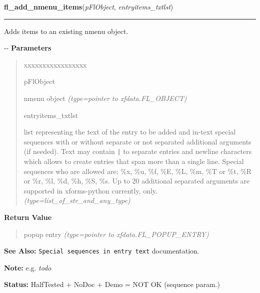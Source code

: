 \hspace{.8\funcindent}\begin{boxedminipage}{\funcwidth}

    \raggedright \textbf{fl\_add\_nmenu\_items}(\textit{pFlObject}, \textit{entryitems\_txtlst})

    \vspace{-1.5ex}

    \rule{\textwidth}{0.5\fboxrule}
\setlength{\parskip}{2ex}

Adds items to an existing nmenu object.

-{}-
\setlength{\parskip}{1ex}
      \textbf{Parameters}
      \vspace{-1ex}

      \begin{quote}
        \begin{Ventry}{xxxxxxxxxxxxxxxxx}

          \item[pFlObject]


nmenu object
            {\it (type=pointer to xfdata.FL\_OBJECT)}

          \item[entryitems\_txtlst]


list representing the text of the entry to be added and in-text
special sequences with or without separate or not separated additional
arguments (if needed). Text may contain \texttt{|} to separate entries and
newline characters which allows to create entries that span more than
a single line. Special sequences who are allowed are: \%x, \%u, \%f, \%E,
\%L, \%m, \%T or \%t, \%R or \%r, \%l, \%d, \%h, \%S, \%s. Up to 20 additional
separated arguments are supported in xforms-python currently, only.
            {\it (type=list\_of\_str\_and\_any\_type)}

        \end{Ventry}

      \end{quote}

      \textbf{Return Value}
    \vspace{-1ex}

      \begin{quote}

popup entry
      {\it (type=pointer to xfdata.FL\_POPUP\_ENTRY)}

      \end{quote}

\textbf{See Also:} 
\texttt{Special sequences in entry text} documentation.


\textbf{Note:} 
e.g. \emph{todo}


\textbf{Status:} 
HalfTested + NoDoc + Demo = NOT OK (sequence param.)


    \end{boxedminipage}


